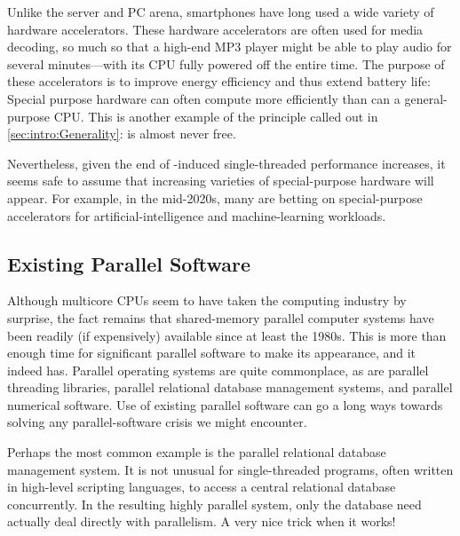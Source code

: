 Unlike the server and PC arena, smartphones have long used a wide
variety of hardware accelerators.
These hardware accelerators are often used for media decoding,
so much so that a high-end MP3 player might be able to play audio
for several minutes---with its CPU fully powered off the entire time.
The purpose of these accelerators is to improve energy efficiency
and thus extend battery life:
Special purpose hardware can often compute more efficiently than
can a general-purpose CPU\@.
This is another example of the principle called out in
\cref{sec:intro:Generality}:
 is almost never free.

Nevertheless, given the end of -induced
single-threaded performance increases, it seems safe to assume that
increasing varieties of special-purpose hardware will appear.
For example, in the mid-2020s, many are betting on special-purpose
accelerators for artificial-intelligence and machine-learning workloads.

\subsection{Existing Parallel Software}
\label{sec:cpu:Existing Parallel Software}

Although multicore CPUs seem to have taken the computing industry by
surprise, the fact remains that shared-memory parallel computer systems
have been readily (if expensively) available since at least the 1980s.
This is more than enough time for significant parallel software
to make its appearance, and it indeed has.
Parallel operating systems are quite commonplace, as are parallel
threading libraries, parallel relational database management systems, 
and parallel numerical software.
Use of existing parallel software can go a long ways towards solving any
parallel-software crisis we might encounter.

Perhaps the most common example is the parallel relational database
management system.
It is not unusual for single-threaded programs, often written in
high-level scripting languages, to access a central relational
database concurrently.
In the resulting highly parallel system, only the database need actually
deal directly with parallelism.
A very nice trick when it works!
